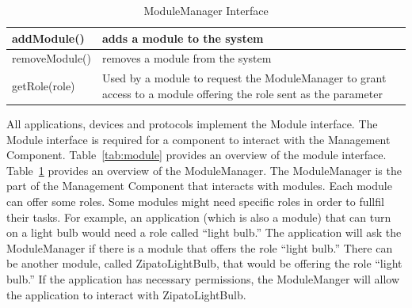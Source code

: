 \begin{table}
\begin{center}
\begin{tabular}{| p{2.5cm} | p{4.5cm} |}
\hline
addModule() & adds a module to the system \\ \hline
removeModule() & removes a module from the system \\ \hline
getRole(role) & Used by a module to request the ModuleManager to grant
access to a module offering the role sent as the parameter  \\ \hline
\end{tabular}
\end{center}
\caption{ModuleManager Interface}
\label{tab:modulemanager}
\end{table}
All applications, devices and protocols implement the Module interface. The
Module interface is required for a component to interact with the Management 
Component. Table~\ref{tab:module} provides an overview of the module interface.
Table~\ref{tab:modulemanager} provides an overview of the ModuleManager.
The ModuleManager is the part of the Management Component that interacts with
modules. Each module can offer some roles. Some modules might need specific
roles in order to fullfil their tasks. For example, an application (which is
also a module) that can turn on a light bulb would need a role called ``light
bulb.'' The application will ask the ModuleManager if there is a module that
offers the role ``light bulb.'' There can be another module, called
ZipatoLightBulb, that would be offering the role ``light bulb.'' If the
application has necessary permissions, the ModuleManger will allow the
application to interact with ZipatoLightBulb.
